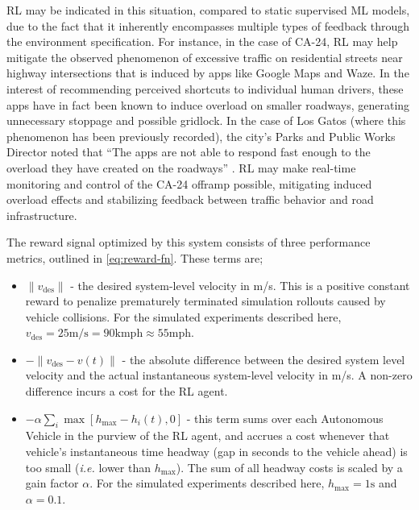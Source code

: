\documentclass[12pt, a4paper, twocolumn]{article}
\begin{document}
\begin{multicols}{2}
{RL may be indicated in this situation, compared to static supervised ML models, due to the fact that it inherently encompasses multiple types of feedback through the environment specification.
For instance, in the case of CA-24, RL may help mitigate the observed phenomenon of excessive traffic on residential streets near highway intersections that is induced by apps like Google Maps and Waze.
In the interest of recommending perceived shortcuts to individual human drivers, these apps have in fact been known to induce overload on smaller roadways, generating unnecessary stoppage and possible gridlock.
In the case of Los Gatos (where this phenomenon has been previously recorded), the city's Parks and Public Works Director noted that ``The apps are not able to respond fast enough to the overload they have created on the roadways'' \cite{judy2018losgatos}.
RL may make real-time monitoring and control of the CA-24 offramp possible, mitigating induced overload effects and stabilizing feedback between traffic behavior and road infrastructure.


}{%

The reward signal optimized by this system consists of three performance metrics, outlined in \cref{eq:reward-fn}.
These terms are;

\begin{itemize}
    \item $\|v_\text{des}\|$ - the desired system-level velocity in m/s.
    This is a positive constant reward to penalize prematurely terminated simulation rollouts caused by vehicle collisions.
    For the simulated experiments described here, $v_\text{des} = 25\text{m/s} = 90\text{kmph} \approx 55\text{mph}$.
    \item $- \|v_\text{des} - v(t)\|$ - the absolute difference between the desired system level velocity and the actual instantaneous system-level velocity in m/s.
    A non-zero difference incurs a cost for the RL agent.
    \item $-\alpha \sum_i \max{[ h_\text{max} - h_i(t), 0 ]}$ - this term sums over each Autonomous Vehicle in the purview of the RL agent, and accrues a cost whenever that vehicle's instantaneous time headway (gap in seconds to the vehicle ahead) is too small (\textit{i.e.} lower than $h_\text{max}$).
    The sum of all headway costs is scaled by a gain factor $\alpha$.
    For the simulated experiments described here, $h_\text{max} = 1\text{s}$ and $\alpha = 0.1$.
\end{itemize}

}{%

}
\end{multicols}
\end{document}
